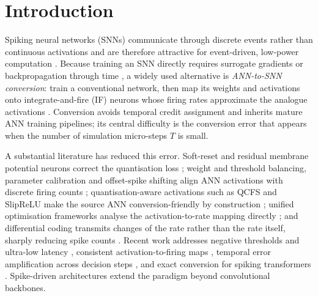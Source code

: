 \documentclass[preprint,12pt]{elsarticle}
\begin{document}
\section{Introduction}
\label{sec:intro}

Spiking neural networks (SNNs) communicate through discrete events rather than continuous activations and are therefore attractive for event-driven, low-power computation \cite{maass1997,akopyan2015truenorth,davies2018loihi}. Because training an SNN directly requires surrogate gradients or backpropagation through time \cite{wu2018stbp,neftci2019surrogate,fang2023spikingjelly}, a widely used alternative is \emph{ANN-to-SNN conversion}: train a conventional network, then map its weights and activations onto integrate-and-fire (IF) neurons whose firing rates approximate the analogue activations \cite{cao2015spiking,diehl2015,rueckauer2017,sengupta2019going}. Conversion avoids temporal credit assignment and inherits mature ANN training pipelines; its central difficulty is the conversion error that appears when the number of simulation micro-steps $T$ is small.

A substantial literature has reduced this error. Soft-reset and residual membrane potential neurons correct the quantisation loss \cite{han2020rmp}; weight and threshold balancing, parameter calibration and offset-spike shifting align ANN activations with discrete firing counts \cite{diehl2015,li2021freelunch,li2022snncap,cos2023offset}; quantisation-aware activations such as QCFS and SlipReLU make the source ANN conversion-friendly by construction \cite{bu2022qcfs,jiang2024universal}; unified optimisation frameworks analyse the activation-to-rate mapping directly \cite{deng2021optimal,jiang2024universal}; and differential coding transmits changes of the rate rather than the rate itself, sharply reducing spike counts \cite{huang2025dcgs}. Recent work addresses negative thresholds and ultra-low latency \cite{xia2026neuro}, consistent activation-to-firing maps \cite{li2024casc}, temporal error amplification across decision steps \cite{xu2026crpi}, and exact conversion for spiking transformers \cite{li2024onespike}. Spike-driven architectures \cite{zhou2023spikformer,che2023autospikformer,yao2023spikedriven,fang2021sew} extend the paradigm beyond convolutional backbones.
\end{document}
